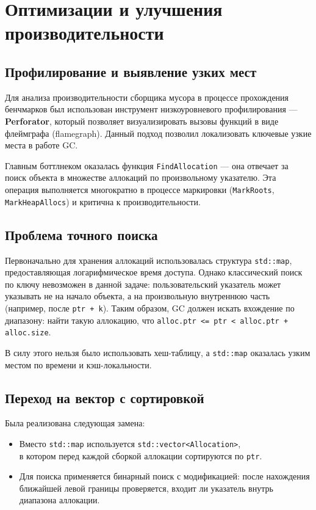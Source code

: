 \section{Оптимизации и улучшения производительности}

\subsection{Профилирование и выявление узких мест}

Для анализа производительности сборщика мусора в процессе прохождения бенчмарков был использован инструмент низкоуровневого профилирования — \textbf{Perforator}, который позволяет визуализировать вызовы функций в виде флеймграфа (flamegraph). Данный подход позволил локализовать ключевые узкие места в работе GC.

Главным боттлнеком оказалась функция \texttt{FindAllocation} — она отвечает за поиск объекта в множестве аллокаций по произвольному указателю. Эта операция выполняется многократно в процессе маркировки (\texttt{MarkRoots}, \texttt{MarkHeapAllocs}) и критична к производительности.

\subsection{Проблема точного поиска}

Первоначально для хранения аллокаций использовалась структура \texttt{std::map}, предоставляющая логарифмическое время доступа. Однако классический поиск по ключу невозможен в данной задаче: пользовательский указатель может указывать не на начало объекта, а на произвольную внутреннюю часть (например, после \texttt{ptr + k}). Таким образом, GC должен искать вхождение по диапазону: найти такую аллокацию, что \texttt{alloc.ptr <= ptr < alloc.ptr + alloc.size}.

В силу этого нельзя было использовать хеш-таблицу, а \texttt{std::map} оказалась узким местом по времени и кэш-локальности.

\subsection{Переход на вектор с сортировкой}

Была реализована следующая замена:

\begin{itemize}
    \item Вместо \texttt{std::map} используется \texttt{std::vector<Allocation>},\\ в котором перед каждой сборкой аллокации сортируются по \texttt{ptr}.
    \item Для поиска применяется бинарный поиск с модификацией: после нахождения ближайшей левой границы проверяется, входит ли указатель внутрь диапазона аллокации.
\end{itemize}

